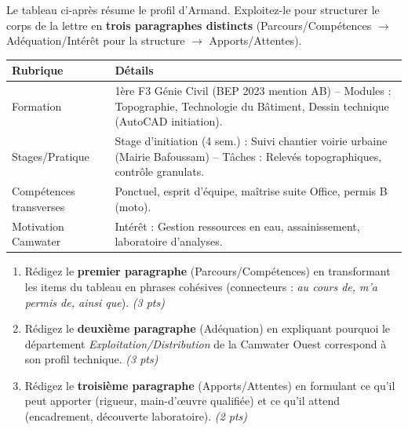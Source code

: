 \documentclass[11pt]{article}
\begin{document}
\begin{exercice}
Le tableau ci-après résume le profil d'Armand. Exploitez-le pour structurer le corps de la lettre en \textbf{trois paragraphes distincts} (Parcours/Compétences $\rightarrow$ Adéquation/Intérêt pour la structure $\rightarrow$ Apports/Attentes).

\begin{tabularx}{\linewidth}{@{}lX@{}}
\toprule
\textbf{Rubrique} & \textbf{Détails} \\
\midrule
Formation & 1ère F3 Génie Civil (BEP 2023 mention AB) -- Modules : Topographie, Technologie du Bâtiment, Dessin technique (AutoCAD initiation). \\
Stages/Pratique & Stage d'initiation (4 sem.) : Suivi chantier voirie urbaine (Mairie Bafoussam) -- Tâches : Relevés topographiques, contrôle granulats. \\
Compétences transverses & Ponctuel, esprit d'équipe, maîtrise suite Office, permis B (moto). \\
Motivation Camwater & Intérêt : Gestion ressources en eau, assainissement, laboratoire d'analyses. \\
\bottomrule
\end{tabularx}

\begin{enumerate}
    \item Rédigez le \textbf{premier paragraphe} (Parcours/Compétences) en transformant les items du tableau en phrases cohésives (connecteurs : \textit{au cours de, m'a permis de, ainsi que}). \textit{(3 pts)}
    \item Rédigez le \textbf{deuxième paragraphe} (Adéquation) en expliquant pourquoi le département \textit{Exploitation/Distribution} de la Camwater Ouest correspond à son profil technique. \textit{(3 pts)}
    \item Rédigez le \textbf{troisième paragraphe} (Apports/Attentes) en formulant ce qu'il peut apporter (rigueur, main-d'œuvre qualifiée) et ce qu'il attend (encadrement, découverte laboratoire). \textit{(2 pts)}
\end{enumerate}
\end{exercice}
\end{document}
